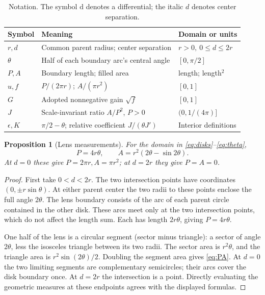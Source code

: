 \documentclass[11pt,a4paper]{article}
\newtheorem{proposition}[theorem]{Proposition}
\theoremstyle{definition}
\newcommand{\dd}{\mathrm d}
\begin{document}
\begin{table}[htbp]
\centering\small
\begin{tabular}{@{}p{.16\linewidth}p{.57\linewidth}p{.19\linewidth}@{}}
\toprule
Symbol & Meaning & Domain or units\\
\midrule
\(r,d\) & Common parent radius; center separation & \(r>0,\ 0\le d\le2r\)\\
\(\theta\) & Half of each boundary arc's central angle & \([0,\pi/2]\)\\
\(P,A\) & Boundary length; filled area & length; length\(^2\)\\
\(u,f\) & \(P/(2\pi r)\); \(A/(\pi r^2)\) & \([0,1]\)\\
\(G\) & Adopted nonnegative gain \(\sqrt f\) & \([0,1]\)\\
\(J\) & Scale-invariant ratio \(A/P^2\), \(P>0\) & \((0,1/(4\pi)]\)\\
\(\epsilon,K\) & \(\pi/2-\theta\); relative coefficient \(J/(\theta J')\) & Interior definitions\\
\bottomrule
\end{tabular}
\caption{Notation. The symbol \(\dd\) denotes a differential; the italic \(d\) denotes center separation.}
\end{table}

\begin{proposition}[Lens measurements]\label{prop:geometry}
For the domain in \eqref{eq:disks}--\eqref{eq:theta},
\begin{equation}\label{eq:PA}
 P=4r\theta,\qquad A=r^2(2\theta-\sin 2\theta).
\end{equation}
At \(d=0\) these give \(P=2\pi r,A=\pi r^2\); at \(d=2r\) they give \(P=A=0\).
\end{proposition}
\begin{proof}
First take \(0<d<2r\). The two intersection points have coordinates
\((0,\pm r\sin\theta)\). At either parent center the two radii to these points enclose the full angle \(2\theta\). The lens boundary consists of the arc of each parent circle contained in the other disk. These arcs meet only at the two intersection points, which do not affect the length sum. Each has length \(2r\theta\), giving \(P=4r\theta\).

One half of the lens is a circular segment (sector minus triangle): a sector of angle \(2\theta\), less the isosceles triangle between its two radii. The sector area is \(r^2\theta\), and the triangle area is \(r^2\sin(2\theta)/2\). Doubling the segment area gives \eqref{eq:PA}. At \(d=0\) the two limiting segments are complementary semicircles; their arcs cover the disk boundary once. At \(d=2r\) the intersection is a point. Directly evaluating the geometric measures at these endpoints agrees with the displayed formulas.
\end{proof}
\end{document}
